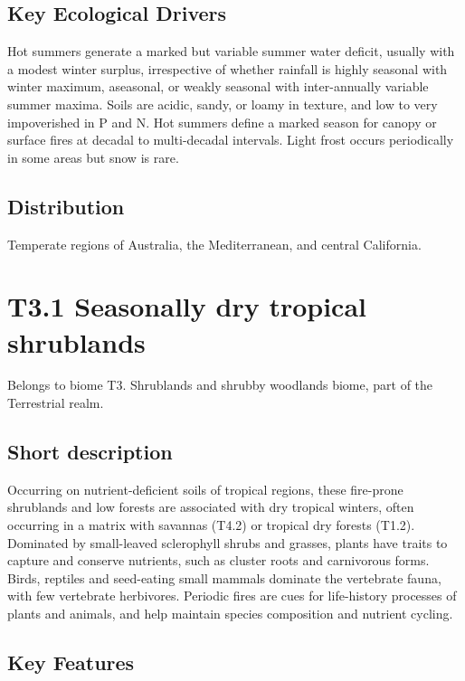 \documentclass[
  letterpaper,
  DIV=11,
  numbers=noendperiod]{scrartcl}
\begin{document}
\subsection{Key Ecological Drivers}\label{key-ecological-drivers-78}

Hot summers generate a marked but variable summer water deficit, usually
with a modest winter surplus, irrespective of whether rainfall is highly
seasonal with winter maximum, aseasonal, or weakly seasonal with
inter-annually variable summer maxima. Soils are acidic, sandy, or loamy
in texture, and low to very impoverished in P and N. Hot summers define
a marked season for canopy or surface fires at decadal to multi-decadal
intervals. Light frost occurs periodically in some areas but snow is
rare.

\subsection{Distribution}\label{distribution-78}

Temperate regions of Australia, the Mediterranean, and central
California.

\section{T3.1 Seasonally dry tropical
shrublands}\label{t3.1-seasonally-dry-tropical-shrublands}

Belongs to biome T3. Shrublands and shrubby woodlands biome, part of the
Terrestrial realm.

\subsection{Short description}\label{short-description-79}

Occurring on nutrient-deficient soils of tropical regions, these
fire-prone shrublands and low forests are associated with dry tropical
winters, often occurring in a matrix with savannas (T4.2) or tropical
dry forests (T1.2). Dominated by small-leaved sclerophyll shrubs and
grasses, plants have traits to capture and conserve nutrients, such as
cluster roots and carnivorous forms. Birds, reptiles and seed-eating
small mammals dominate the vertebrate fauna, with few vertebrate
herbivores. Periodic fires are cues for life-history processes of plants
and animals, and help maintain species composition and nutrient cycling.

\subsection{Key Features}\label{key-features-79}
\end{document}
